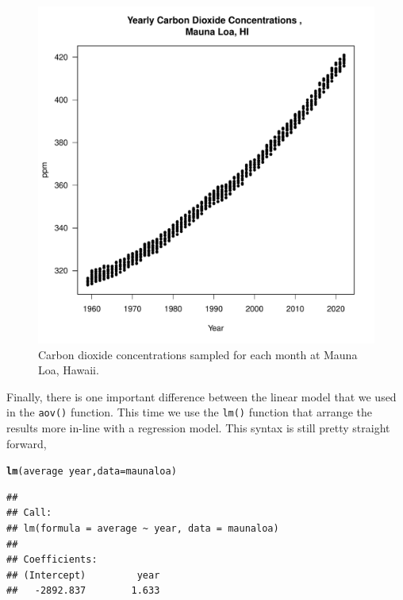 \documentclass{tufte-handout}\usepackage[]{graphicx}\usepackage[]{xcolor}
\makeatletter
\def\maxwidth{ %
  \ifdim\Gin@nat@width>\linewidth
    \linewidth
  \else
    \Gin@nat@width
  \fi
}
\newcommand{\hlopt}[1]{\textcolor[rgb]{0,0,0}{#1}}%
\newcommand{\hlstd}[1]{\textcolor[rgb]{0.345,0.345,0.345}{#1}}%
\newcommand{\hlkwc}[1]{\textcolor[rgb]{0.333,0.667,0.333}{#1}}%
\newcommand{\hlkwd}[1]{\textcolor[rgb]{0.737,0.353,0.396}{\textbf{#1}}}%
\newenvironment{kframe}{%
 \def\at@end@of@kframe{}%
 \ifinner\ifhmode%
  \def\at@end@of@kframe{\end{minipage}}%
  \begin{minipage}{\columnwidth}%
 \fi\fi%
 \def\FrameCommand##1{\hskip\@totalleftmargin \hskip-\fboxsep
 \colorbox{shadecolor}{##1}\hskip-\fboxsep
     \hskip-\linewidth \hskip-\@totalleftmargin \hskip\columnwidth}%
 \MakeFramed {\advance\hsize-\width
   \@totalleftmargin\z@ \linewidth\hsize
   \@setminipage}}%
 {\par\unskip\endMakeFramed%
 \at@end@of@kframe}
\newenvironment{knitrout}{}{} %
\makeatother
\begin{document}
\begin{figure}
\label{fig:maunaloa}
\caption{Carbon dioxide concentrations sampled for each month at Mauna Loa, Hawaii.}
\begin{knitrout}
\color{fgcolor}
\includegraphics[width=\maxwidth]{figure/unnamed-chunk-52-1} 
\end{knitrout}
\end{figure}


Finally, there is one important difference between the linear model that we used in the \texttt{aov()} function. This time we use the \texttt{lm()} function that arrange the results more in-line with a regression model.
This syntax is still pretty straight forward,  

\begin{knitrout}
\color{fgcolor}\begin{kframe}
\begin{alltt}
\hlkwd{lm}\hlstd{(average} \hlopt{~} \hlstd{year,} \hlkwc{data}\hlstd{=maunaloa)}
\end{alltt}
\begin{verbatim}
## 
## Call:
## lm(formula = average ~ year, data = maunaloa)
## 
## Coefficients:
## (Intercept)         year  
##   -2892.837        1.633
\end{verbatim}
\end{kframe}
\end{knitrout}
\end{document}
